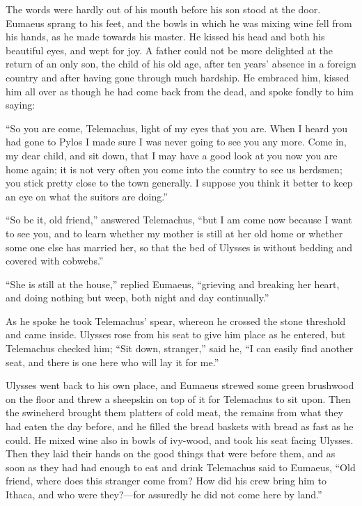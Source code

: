 The words were hardly out of his mouth before his son stood at the door.
Eumaeus sprang to his feet, and the bowls in which he was mixing wine fell from
his hands, as he made towards his master. He kissed his head and both his
beautiful eyes, and wept for joy. A father could not be more delighted at the
return of an only son, the child of his old age, after ten years’ absence in a
foreign country and after having gone through much hardship. He embraced him,
kissed him all over as though he had come back from the dead, and spoke fondly
to him saying:

“So you are come, Telemachus, light of my eyes that you are. When I heard you
had gone to Pylos I made sure I was never going to see you any more. Come in,
my dear child, and sit down, that I may have a good look at you now you are
home again; it is not very often you come into the country to see us herdsmen;
you stick pretty close to the town generally. I suppose you think it better to
keep an eye on what the suitors are doing.”

“So be it, old friend,” answered Telemachus, “but I am come now because I want
to see you, and to learn whether my mother is still at her old home or whether
some one else has married her, so that the bed of Ulysses is without bedding
and covered with cobwebs.”

“She is still at the house,” replied Eumaeus, “grieving and breaking her heart,
and doing nothing but weep, both night and day continually.”

As he spoke he took Telemachus’ spear, whereon he crossed the stone threshold
and came inside. Ulysses rose from his seat to give him place as he entered,
but Telemachus checked him; “Sit down, stranger,” said he, “I can easily find
another seat, and there is one here who will lay it for me.”

Ulysses went back to his own place, and Eumaeus strewed some green brushwood on
the floor and threw a sheepskin on top of it for Telemachus to sit upon. Then
the swineherd brought them platters of cold meat, the remains from what they
had eaten the day before, and he filled the bread baskets with bread as fast as
he could. He mixed wine also in bowls of ivy-wood, and took his seat facing
Ulysses. Then they laid their hands on the good things that were before them,
and as soon as they had had enough to eat and drink Telemachus said to Eumaeus,
“Old friend, where does this stranger come from? How did his crew bring him to
Ithaca, and who were they?—for assuredly he did not come here by land.”

